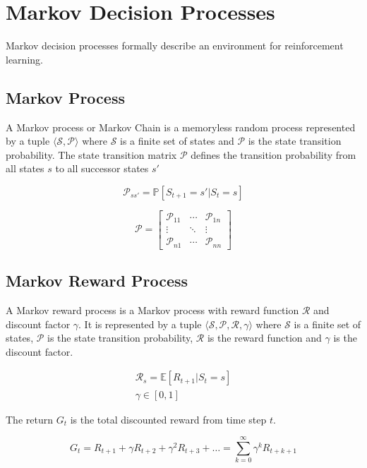 \section{Markov Decision Processes}

\noindent Markov decision processes formally describe an environment for reinforcement
learning.

\subsection{Markov Process}

A Markov process or Markov Chain is a memoryless random process represented by
a tuple $\langle\mathcal{S}, \mathcal{P}\rangle$ where $\mathcal{S}$ is a
finite set of states and $\mathcal{P}$ is the state transition probability. The
state transition matrix $\mathcal{P}$ defines the transition probability from
all states $s$ to all successor states $s'$

\[
    \mathcal{P}_{ss'} = \mathbb{P}[S_{t+1} = s' | S_t = s]
\]

\[
    \mathcal{P} = \begin{bmatrix}
        \mathcal{P}_{11} & \cdots & \mathcal{P}_{1n} \\
        \vdots           & \ddots & \vdots           \\
        \mathcal{P}_{n1} & \cdots & \mathcal{P}_{nn}
    \end{bmatrix}
\]

\subsection{Markov Reward Process}

A Markov reward process is a Markov process with reward function $\mathcal{R}$
and discount factor $\gamma$. It is represented by a tuple $\langle\mathcal{S},
    \mathcal{P}, \mathcal{R}, \gamma\rangle$ where $\mathcal{S}$ is a finite set of
states, $\mathcal{P}$ is the state transition probability, $\mathcal{R}$ is the
reward function and $\gamma$ is the discount factor.

\begin{gather*}
    \mathcal{R}_s = \mathbb{E}[R_{t+1} | S_t = s] \\
    \gamma \in [0, 1]
\end{gather*}

\noindent The return $G_t$ is the total discounted reward from time step $t$.

\[
    G_t = R_{t+1} + \gamma R_{t+2} + \gamma^2 R_{t+3} + \ldots = \sum_{k=0}^{\infty} \gamma^k R_{t+k+1}
\]

